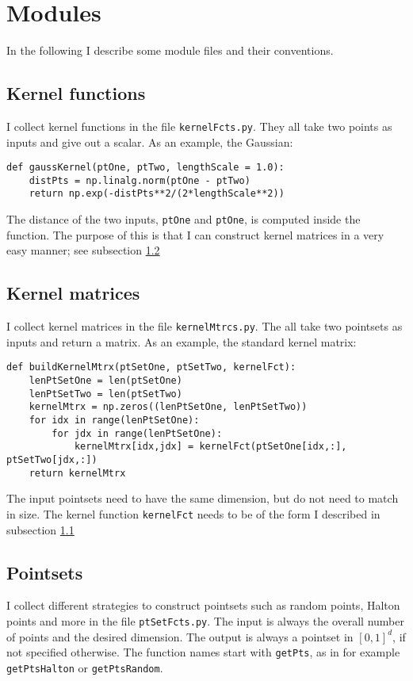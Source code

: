 \documentclass[12pt]{article}
\begin{document}
\section{Modules}

In the following I describe some module files and their conventions.



\subsection{Kernel functions}
	\label{subsec:kernelFcts}
I collect kernel functions in the file \texttt{kernelFcts.py}. They all take two points as inputs and give out a scalar. As an example, the Gaussian:
\begin{Verbatim}[formatcom=\color{blue!50!black}]
def gaussKernel(ptOne, ptTwo, lengthScale = 1.0):
    distPts = np.linalg.norm(ptOne - ptTwo)
    return np.exp(-distPts**2/(2*lengthScale**2))
\end{Verbatim}

The distance of the two inputs, \texttt{ptOne} and \texttt{ptOne}, is computed inside the function. The purpose of this is that I can construct kernel matrices in a very easy manner; see subsection \ref{subsec:kernelMtrcs}

\subsection{Kernel matrices}
\label{subsec:kernelMtrcs}
I collect kernel matrices in the file \texttt{kernelMtrcs.py}. The all take two pointsets as inputs and return a matrix. As an example, the standard kernel matrix: 
\begin{Verbatim}[formatcom=\color{blue!50!black}]
def buildKernelMtrx(ptSetOne, ptSetTwo, kernelFct):
    lenPtSetOne = len(ptSetOne)
    lenPtSetTwo = len(ptSetTwo)
    kernelMtrx = np.zeros((lenPtSetOne, lenPtSetTwo))
    for idx in range(lenPtSetOne):
        for jdx in range(lenPtSetOne):
            kernelMtrx[idx,jdx] = kernelFct(ptSetOne[idx,:], ptSetTwo[jdx,:])
    return kernelMtrx
\end{Verbatim}

The input pointsets need to have the same dimension, but do not need to match in size. The kernel function \texttt{kernelFct} needs to be of the form I described in subsection \ref{subsec:kernelFcts}


\subsection{Pointsets}
I collect different strategies to construct pointsets such as random points, Halton points and more in the file \texttt{ptSetFcts.py}. The input is always the overall number of points and the desired dimension. The output is always a pointset in $[0,1]^d$, if not specified otherwise. The function names start with \texttt{getPts}, as in for example \texttt{getPtsHalton} or \texttt{getPtsRandom}.
\end{document}
